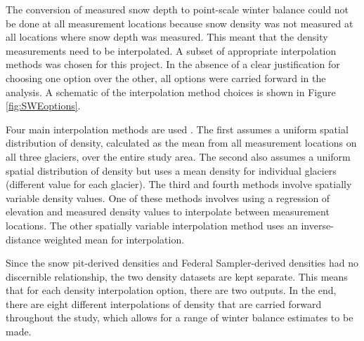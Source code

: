 \documentclass{sfuthesis}
\begin{document}
The conversion of measured snow depth to point-scale winter balance could not be done at all measurement locations because snow density was not measured at all locations where snow depth was measured. This meant that the density measurements need to be interpolated. A subset of appropriate interpolation methods was chosen for this project. In the absence of a clear justification for choosing one option over the other, all options were carried forward in the analysis. A schematic of the interpolation method choices is shown in Figure \ref{fig:SWEoptions}. 

Four main interpolation methods are used \citep{McGrath2015, Elder1991}. The first assumes a uniform spatial distribution of density, calculated as the mean from all measurement locations on all three glaciers, over the entire study area. The second  also assumes a uniform spatial distribution of density but uses a mean density for individual glaciers (different value for each glacier). The third and fourth methods involve spatially variable density values. One of these methods involves using a regression of elevation and measured density values to interpolate between measurement locations. The other spatially variable interpolation method uses an inverse-distance weighted mean for interpolation. 

Since the snow pit-derived densities and Federal Sampler-derived densities had no discernible relationship, the two density datasets are kept separate. This means that for each density interpolation option, there are two outputs. In the end, there are eight different interpolations of density that are carried forward throughout the study, which allows for a range of winter balance estimates to be made. 
\end{document}
